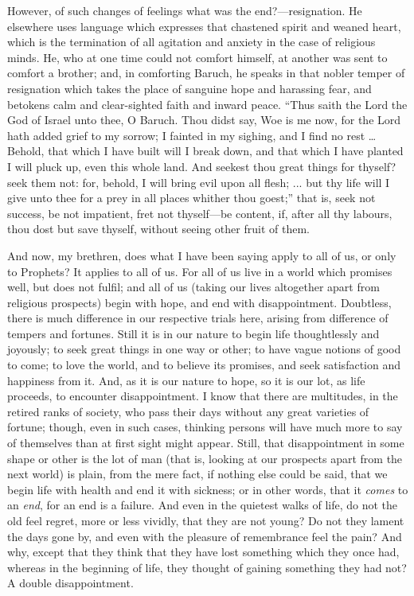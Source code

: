 However, of such changes of feelings what was the end?—resignation.
He elsewhere uses language which expresses that chastened spirit and
weaned heart, which is the termination of all agitation and anxiety in
the case of religious minds. He, who at one time could not comfort
himself, at another was sent to comfort a brother; and, in comforting
Baruch, he speaks in that nobler temper of resignation which takes the
place of sanguine hope and harassing fear, and betokens calm and
clear-sighted faith and inward peace. ``Thus saith the Lord the
God of Israel unto thee, O Baruch. Thou didst say, Woe is me now, for
the Lord hath added grief to my sorrow; I fainted in my sighing, and I
find no rest … Behold, that which I have built will I break down,
and that which I have planted I will pluck up, even this whole land.
And seekest thou great things for thyself? seek them not: for, behold,
I will bring evil upon all flesh; ... but thy life will I give unto
thee for a prey in all places whither thou goest;'' that is, seek
not success, be not impatient, fret not thyself—be content, if,
after all thy labours, thou dost but save thyself, without seeing
other fruit of them.

And now, my brethren, does what I have been saying apply to all of
us, or only to Prophets? It applies to all of us. For all of us live
in a world which promises well, but does not fulfil; and all of us
(taking our lives altogether apart from religious prospects) begin
with hope, and end with disappointment. Doubtless, there is much
difference in our respective trials here, arising from difference of
tempers and fortunes. Still it is in our nature to begin life
thoughtlessly and joyously; to seek great things in one way or other;
to have vague notions of good to come; to love the world, and to
believe its promises, and seek satisfaction and happiness from it.
And, as it is our nature to hope, so it is our lot, as life proceeds,
to encounter disappointment. I know that there are multitudes, in the
retired ranks of society, who pass their days without any great
varieties of fortune; though, even in such cases, thinking persons
will have much more to say of themselves than at first sight might
appear. Still, that disappointment in some shape or other is the lot
of man (that is, looking at our prospects apart from the next world)
is plain, from the mere fact, if nothing else could be said, that we
begin life with health and end it with sickness; or in other words,
that it \emph{comes} to an \emph{end}, for an end is a failure. And
even in the quietest walks of life, do not the old feel regret, more
or less vividly, that they are not young? Do not they lament the days
gone by, and even with the pleasure of remembrance feel the pain? And
why, except that they think that they have lost something which they
once had, whereas in the beginning of life, they thought of gaining
something they had not? A double disappointment.

